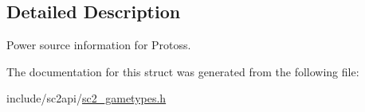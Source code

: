 \subsection{Detailed Description}
Power source information for Protoss. 

The documentation for this struct was generated from the following file\+:\begin{DoxyCompactItemize}
\item 
include/sc2api/\hyperlink{sc2__gametypes_8h}{sc2\+\_\+gametypes.\+h}\end{DoxyCompactItemize}
